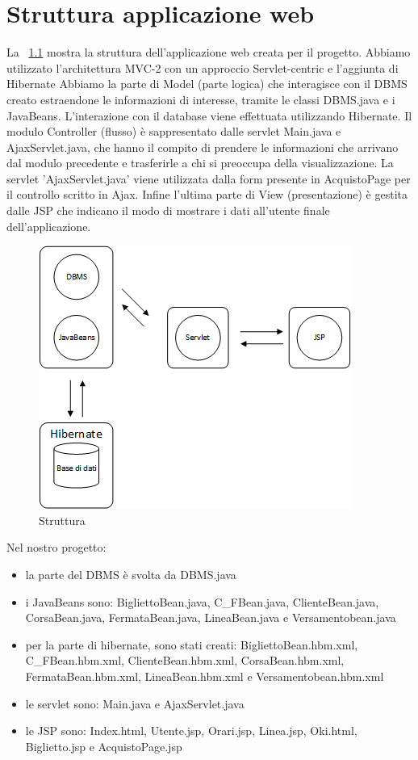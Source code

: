 \documentclass[a4paper,11pt]{book}
\begin{document}
\chapter{Struttura applicazione web}
La \figurename ~\ref{fig:struttura} mostra la struttura dell’applicazione web creata per il progetto. Abbiamo utilizzato l'architettura MVC-2 con un approccio Servlet-centric e l'aggiunta di Hibernate 
Abbiamo la parte di Model (parte logica) che interagisce con il DBMS creato estraendone le informazioni di interesse, tramite le classi DBMS.java e i JavaBeans. L'interazione con il database viene effettuata utilizzando Hibernate. Il modulo Controller (flusso) è sappresentato dalle servlet Main.java e AjaxServlet.java, che hanno il compito di prendere le informazioni che arrivano dal modulo precedente e trasferirle a chi si preoccupa della visualizzazione. La servlet 'AjaxServlet.java' viene utilizzata dalla form presente in AcquistoPage per il controllo scritto in Ajax. Inﬁne l’ultima parte di View (presentazione) è gestita dalle JSP che indicano il modo di mostrare i dati all’utente ﬁnale dell’applicazione.


\begin{figure}[!ht]
\centering
\includegraphics[scale = 0.3]{Struttura.png}
\caption{Struttura}
\label{fig:struttura}
\end{figure}

Nel nostro progetto: 
\begin{itemize}
\item la parte del DBMS è svolta da DBMS.java 
\item i JavaBeans sono: BigliettoBean.java, C_FBean.java, ClienteBean.java, CorsaBean.java, FermataBean.java, LineaBean.java e Versamentobean.java
\item per la parte di hibernate, sono stati creati: BigliettoBean.hbm.xml, C_FBean.hbm.xml, ClienteBean.hbm.xml, CorsaBean.hbm.xml, FermataBean.hbm.xml, LineaBean.hbm.xml e Versamentobean.hbm.xml
\item le servlet sono: Main.java e AjaxServlet.java
\item le JSP sono: Index.html, Utente.jsp, Orari.jsp, Linea.jsp, Oki.html, Biglietto.jsp e AcquistoPage.jsp 
\end{itemize}
\end{document}
